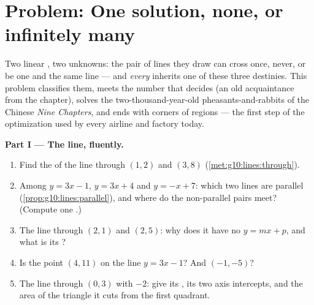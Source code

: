 \section{Problem: One solution, none, or infinitely many}

\begin{problem}
\label{pb:g10:lines:1}
Two linear , two unknowns: the pair of lines they draw
can cross once, never, or be one and the same line --- and
\emph{every}  inherits one of these three destinies.
This problem classifies them, meets the number that decides (an
old acquaintance from the  chapter), solves the
two-thousand-year-old pheasants-and-rabbits of the Chinese
\emph{Nine Chapters}, and ends with corners of regions --- the
first step of the optimization used by every airline and factory
today.

\medskip
\noindent\textbf{Part I --- The line, fluently.}
\begin{enumerate}
  \item Find the  of the line through
        $(1, 2)$ and $(3, 8)$
        (\cref{met:g10:lines:through}).
  \item Among $y = 3x - 1$, $y = 3x + 4$ and $y = -x + 7$: which
        two lines are parallel
        (\cref{prop:g10:lines:parallel}), and where do the
        non-parallel pairs meet? (Compute one .)
  \item The line through $(2, 1)$ and $(2, 5)$: why does it have
        no  $y = mx + p$, and what is its
        ?
  \item Is the point $(4, 11)$ on the line $y = 3x - 1$? And
        $(-1, -5)$?
  \item The line through $(0, 3)$ with  $-2$: give its
        , its two axis intercepts, and the area of the
        triangle it cuts from the first quadrant.
\end{enumerate}


\end{problem}
